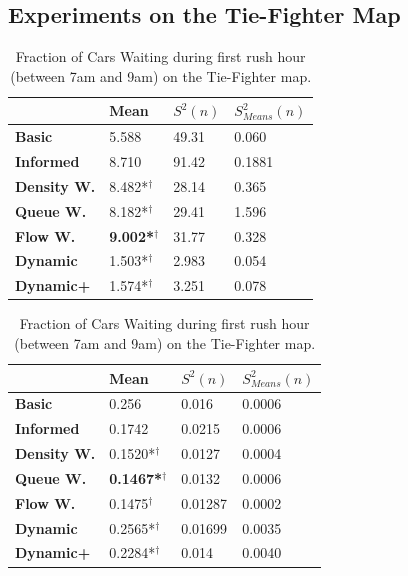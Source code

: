 \documentclass[11pt]{article}
\begin{document}
\subsection{Experiments on the Tie-Fighter Map}
\begin{table}[t]
\centering
\caption{Average Velocity of Cars during first rush hour (between 7am and 9am) on the Tie-Fighter map.}
\label{tab:velo-morning-tie}
\begin{tabular}{l|l|l|l|}
\textbf{}                 & \textbf{Mean} & \textbf{$S^2(n)$} & \textbf{$S_{Means}^2(n)$} \\
\hline\textbf{Basic}            & 5.588          & 49.31             & 0.060                      \\
\textbf{Informed}         & 8.710          & 91.42             & 0.1881                     \\
\hline\textbf{Density W.} & 8.482*$^\dagger$          & 28.14             & 0.365                      \\
\textbf{Queue W.}   & 8.182*$^\dagger$          & 29.41             & 1.596                      \\
\textbf{Flow W.}    & \textbf{9.002*$^\dagger$} & 31.77             & 0.328                      \\
\textbf{Dynamic}          & 1.503*$^\dagger$          & 2.983             & 0.054                      \\
\textbf{Dynamic+}         & 1.574*$^\dagger$          & 3.251             & 0.078                   
\end{tabular}
\vspace{20pt}
\centering
\caption{Fraction of Cars Waiting during first rush hour (between 7am and 9am) on the Tie-Fighter map.}
\label{tab:waiting-morning-tie}
\begin{tabular}{l|l|l|l|}
\textbf{}                 & \textbf{Mean} & \textbf{$S^2(n)$} & \textbf{$S_{Means}^2(n)$} \\
\hline\textbf{Basic}      & 0.256           & 0.016             & 0.0006                     \\
\textbf{Informed}   & 0.1742          & 0.0215            & 0.0006                     \\
\hline\textbf{Density W.} & 0.1520*$^\dagger$          & 0.0127            & 0.0004                     \\
\textbf{Queue W.}   & \textbf{0.1467*$^\dagger$} & 0.0132            & 0.0006                     \\
\textbf{Flow W.}    & 0.1475$^\dagger$          & 0.01287           & 0.0002                     \\
\textbf{Dynamic}    & 0.2565*$^\dagger$          & 0.01699           & 0.0035                     \\
\textbf{Dynamic+}   & 0.2284*$^\dagger$          & 0.014             & 0.0040                    
\end{tabular}
\end{table}
\end{document}
